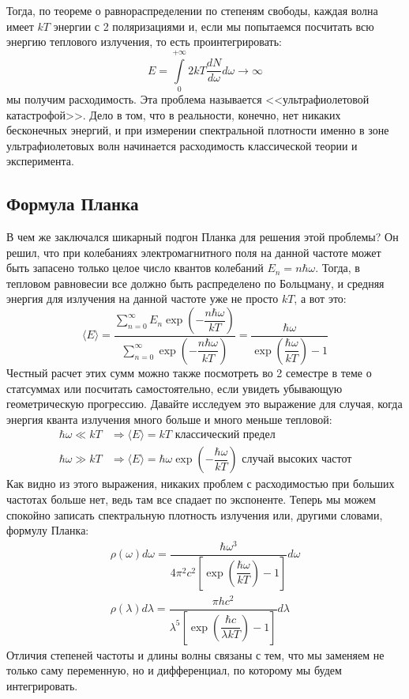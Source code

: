\documentclass[12pt]{article}
\begin{document}
\vspace{-8mm}
\noindent Тогда, по теореме о равнораспределении по степеням свободы, каждая волна имеет $kT$ энергии с 2 поляризациями и, если мы попытаемся посчитать всю энергию теплового излучения, то есть проинтегрировать: 
\begin{equation*}
    E = \int\limits_{0}^{+\infty} 2kT\dfrac{dN}{d\omega}d\omega \rightarrow \infty
\end{equation*}
мы получим расходимость. Эта проблема называется <<ультрафиолетовой катастрофой>>. Дело в том, что в реальности, конечно, нет никаких бесконечных энергий, и при измерении спектральной плотности именно в зоне ультрафиолетовых волн начинается расходимость классической теории и эксперимента.

\subsection{Формула Планка}
В чем же заключался шикарный подгон Планка для решения этой проблемы? Он решил, что при колебаниях электромагнитного поля на данной частоте может быть запасено только целое число квантов колебаний $E_n =n \hbar \omega$. Тогда, в тепловом равновесии все должно быть распределено по Больцману, и средняя энергия для излучения на данной частоте уже не просто $kT$, а вот это:
\begin{equation*}
    \langle E \rangle = \dfrac{\sum\limits_{n=0}^{\infty} E_n \exp{\left(-\dfrac{n\hbar \omega}{kT}\right)}}{\sum\limits_{n=0}^{\infty} \exp{\left(-\dfrac{n\hbar \omega}{kT}\right)}} = \dfrac{\hbar \omega}{\exp{\left(\dfrac{\hbar \omega}{kT}\right)} - 1}
\end{equation*}
Честный расчет этих сумм можно также посмотреть во 2 семестре в теме о статсуммах или посчитать самостоятельно, если увидеть убывающую геометрическую прогрессию. Давайте исследуем это выражение для случая, когда энергия кванта излучения много больше и много меньше тепловой:\vspace{-1mm}
\begin{align*}
    \hbar \omega \ll kT &\Rightarrow \langle E \rangle = kT \text{ классический предел} \\
    \hbar \omega \gg kT &\Rightarrow \langle E \rangle = \hbar \omega  \exp{\left(-\dfrac{\hbar \omega}{kT}\right)} \text{ случай высоких частот}
\end{align*}\vspace{-1mm}
Как видно из этого выражения, никаких проблем с расходимостью при больших частотах больше нет, ведь там все спадает по экспоненте. Теперь мы можем спокойно записать спектральную плотность излучения или, другими словами, формулу Планка:
\begin{gather}
\label{eq:sem_01_plank}
    \rho(\omega)d\omega = \dfrac{\hbar \omega^3}{4\pi^2c^2\left[ \exp{\left(\dfrac{\hbar \omega}{kT}\right)} - 1\right]}d\omega\\
    \rho(\lambda) d\lambda = \dfrac{\pi h c^2}{\lambda^5\left[ \exp{\left(\dfrac{\hbar c}{\lambda kT}\right)} - 1\right]}d\lambda
\end{gather}
Отличия степеней частоты и длины волны связаны с тем, что мы заменяем не только саму переменную, но и дифференциал, по которому мы будем интегрировать.
\end{document}
